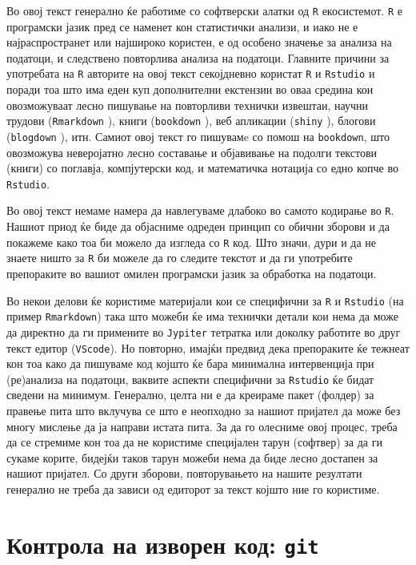 \documentclass[
]{book}
\begin{document}
Во овој текст генерално ќе работиме со софтверски алатки од \texttt{R} екосистемот. \texttt{R} е програмски јазик пред се наменет кон статистички анализи, и иако не е најраспространет или најшироко користен, е од особено значење за анализа на податоци, и следствено повторлива анализа на податоци. Главните причини за употребата на \texttt{R} авторите на овој текст секојдневно користат \texttt{R} и \texttt{Rstudio} и поради тоа што има еден куп дополнителни екстензии во оваа средина кои овозможуваат лесно пишување на повторливи технички извештаи, научни трудови (\texttt{Rmarkdown} \citep{R-rmarkdown}), книги (\texttt{bookdown} \citep{R-bookdown}), веб апликации (\texttt{shiny} \citep{R-shiny}), блогови (\texttt{blogdown} \citep{R-blogdown}), итн. Самиот овој текст го пишувамe со помош на \texttt{bookdown}, што овозможува неверојатно лесно составање и објавивање на подолги текстови (книги) со поглавја, компјутерски код, и математичка нотација со едно копче во \texttt{Rstudio}.

Во овој текст немаме намера да навлегуваме длабоко во самото кодирање во \texttt{R}. Нашиот приод ќе биде да објасниме одреден принцип со обични зборови и да покажеме како тоа би можело да изгледа со \texttt{R} код. Што значи, дури и да не знаете ништо за \texttt{R} би можеле да го следите текстот и да ги употребите препораките во вашиот омилен програмски јазик за обработка на податоци.

Во некои делови ќе користиме материјали кои се специфични за \texttt{R} и \texttt{Rstudio} (на пример \texttt{Rmarkdown}) така што можеби ќе има технички детали кои нема да може да директно да ги примените во \texttt{Jypiter} тетратка или доколку работите во друг текст едитор (\texttt{VScode}). Но повторно, имајќи предвид дека препораките ќе тежнеат кон тоа како да пишуваме код којшто ќе бара минимална интервенција при (ре)анализа на податоци, ваквите аспекти специфични за \texttt{Rstudio} ќе бидат сведени на минимум. Генерално, целта ни е да креираме пакет (фолдер) за правење пита што вклучува се што е неопходно за нашиот пријател да може без многу мислење да ја направи истата пита. За да го олесниме овој процес, треба да се стремиме кон тоа да не користиме специјален тарун (софтвер) за да ги сукаме корите, бидејќи таков тарун можеби нема да биде лесно достапен за нашиот пријател. Со други зборови, повторувањето на нашите резултати генерално не треба да зависи од едиторот за текст којшто ние го користиме.

\hypertarget{ux43aux43eux43dux442ux440ux43eux43bux430-ux43dux430-ux438ux437ux432ux43eux440ux435ux43d-ux43aux43eux434-git}{%
\section{\texorpdfstring{Контрола на изворен код: \texttt{git}}{Контрола на изворен код: git}}\label{ux43aux43eux43dux442ux440ux43eux43bux430-ux43dux430-ux438ux437ux432ux43eux440ux435ux43d-ux43aux43eux434-git}}
\end{document}
